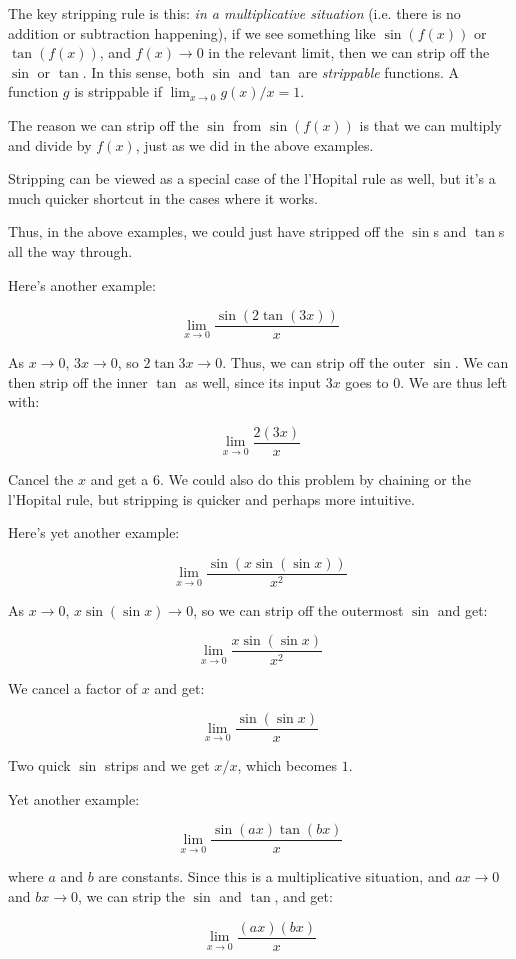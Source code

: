 \documentclass[10pt]{amsart}
\begin{document}
The key stripping rule is this: {\em in a multiplicative situation}
(i.e. there is no addition or subtraction happening), if we see
something like $\sin(f(x))$ or $\tan(f(x))$, and $f(x) \to 0$ in the
relevant limit, then we can strip off the $\sin$ or $\tan$. In this
sense, both $\sin$ and $\tan$ are {\em strippable} functions. A
function $g$ is strippable if $\lim_{x \to 0} g(x)/x = 1$.

The reason we can strip off the $\sin$ from $\sin(f(x))$ is that we
can multiply and divide by $f(x)$, just as we did in the above
examples.

Stripping can be viewed as a special case of the l'Hopital rule as
well, but it's a much quicker shortcut in the cases where it works.

Thus, in the above examples, we could just have stripped off the
$\sin$s and $\tan$s all the way through.

Here's another example:

$$\lim_{x \to 0} \frac{\sin(2 \tan (3x))}{x}$$

As $x \to 0$, $3x \to 0$, so $2 \tan 3x \to 0$. Thus, we can strip off
the outer $\sin$. We can then strip off the inner $\tan$ as well,
since its input $3x$ goes to $0$. We are thus left with:

$$\lim_{x \to 0} \frac{2(3x)}{x}$$

Cancel the $x$ and get a $6$. We could also do this problem by
chaining or the l'Hopital rule, but stripping is quicker and perhaps
more intuitive.

Here's yet another example:

$$\lim_{x \to 0} \frac{\sin (x \sin (\sin x))}{x^2}$$

As $x \to 0$, $x \sin(\sin x) \to 0$, so we can strip off the
outermost $\sin$ and get:

$$\lim_{x \to 0} \frac{x \sin(\sin x)}{x^2}$$

We cancel a factor of $x$ and get:

$$\lim_{x \to 0} \frac{\sin(\sin x)}{x}$$

Two quick $\sin$ strips and we get $x/x$, which becomes $1$.

Yet another example:

$$\lim_{x \to 0} \frac{\sin(ax)\tan(bx)}{x}$$

where $a$ and $b$ are constants. Since this is a multiplicative
situation, and $ax \to 0$ and $bx \to 0$, we can strip the $\sin$ and
$\tan$, and get:

$$\lim_{x \to 0} \frac{(ax)(bx)}{x}$$
\end{document}
